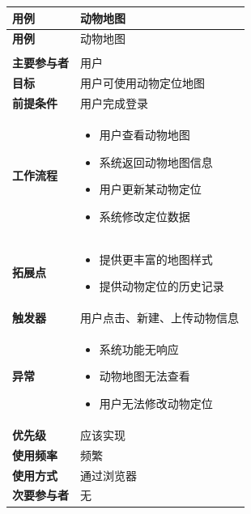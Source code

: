 \documentclass[12pt,a4paper,UTF8]{article}
\begin{document}
\begin{xltabular}{\linewidth}{|>{\raggedright\arraybackslash}p{3cm}|>{\raggedright\arraybackslash}p{8cm}|}
  \hline
  \textbf{用例} & 动物地图 \\ \hline \endfirsthead
  \hline
  \textbf{用例} & 动物地图 \\ \hline \endhead
  \hline
   \\ \endfoot
  \hline \endlastfoot

  \textbf{主要参与者} & 用户 \\ \hline
  \textbf{目标} & 用户可使用动物定位地图 \\ \hline
  \textbf{前提条件} & 用户完成登录 \\ \hline
  \textbf{工作流程} & 
  \vspace{-0.5em}
  \begin{itemize}[topsep=0pt, partopsep=0pt, left=0pt, nosep]
      \item 用户查看动物地图
      \item 系统返回动物地图信息
      \item 用户更新某动物定位
      \item 系统修改定位数据
  \end{itemize} \\ \hline
  \textbf{拓展点} &
  \vspace{-0.5em}
  \begin{itemize}[topsep=0pt, partopsep=0pt, left=0pt, nosep]
      \item 提供更丰富的地图样式
      \item 提供动物定位的历史记录
  \end{itemize} \\ \hline
  \textbf{触发器} & 用户点击、新建、上传动物信息 \\ \hline
  \textbf{异常} & 
  \vspace{-0.5em}
  \begin{itemize}[topsep=0pt, partopsep=0pt, left=0pt, nosep]
      \item 系统功能无响应
      \item 动物地图无法查看
      \item 用户无法修改动物定位
  \end{itemize} \\ \hline
  \textbf{优先级} & 应该实现 \\ \hline
  \textbf{使用频率} & 频繁 \\ \hline
  \textbf{使用方式} & 通过浏览器 \\ \hline
  \textbf{次要参与者} & 无 \\ \hline
\end{xltabular}
\end{document}
